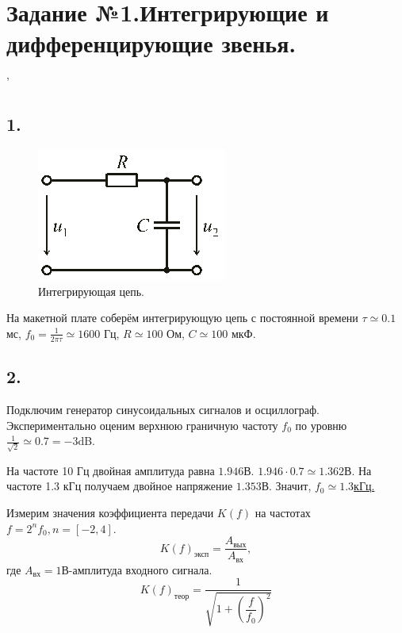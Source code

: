 \documentclass[a4paper, 12pt, twoside]{article}
\begin{document}
\section*{Задание №1.Интегрирующие и дифференцирующие звенья.}
'
\subsection*{1.}
	\begin{figure}
		\includegraphics[width =  \linewidth]{integer}
		\caption{Интегрирующая цепь.}
		\label{RLC}
	\end{figure}	На макетной плате соберём интегрирующую цепь с постоянной времени $\tau \simeq 0.1$ мс, $f_0 = \frac{1}{2\pi \tau} \simeq 1600$ Гц, $R\simeq 100$ Ом, $C \simeq 100$ мкФ.

\subsection*{2.}
Подключим генератор синусоидальных сигналов и осциллограф. Экспериментально оценим верхнюю граничную частоту $f_0$ по уровню $\frac{1}{\sqrt{2}} \simeq 0.7 = -3$dB.

На частоте 10 Гц двойная амплитуда равна $1.946$В.
$1.946 \cdot 0.7 \simeq 1.362$В. На частоте 1.3 кГц получаем двойное напряжение $1.353$В. Значит, \underline{$f_0 \simeq 1.3$кГц.}

Измерим значения коэффициента передачи $K(f) $ на частотах $f=2^n f_0, n = [-2, 4]$.
$$K(f)_{\text{эксп}} = \dfrac{A_{\text{вых}}}{A_{\text{вх}}},$$ где $A_{\text{вх}} = 1$В-амплитуда входного сигнала.
$$ K(f)_{\text{теор}} = \dfrac{1}{\sqrt{1+\left (\dfrac{f}{f_0}\right )^2}} $$
\end{document}
